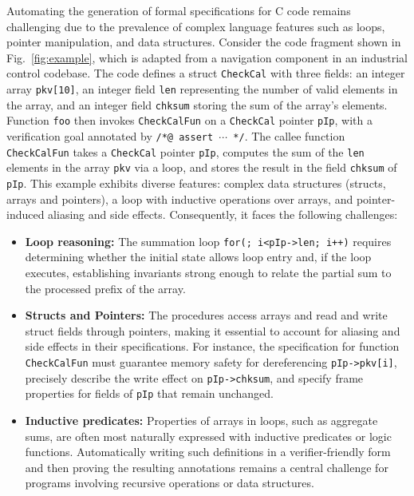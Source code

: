 
\newcommand{\annotate}[1]{{\color{figloop!75!black} \mathsf{#1}}}

Automating the generation of formal specifications for C code remains challenging due to the prevalence of complex language features such as loops, pointer manipulation, and data structures. Consider the code fragment shown in Fig.~\ref{fig:example}, which is adapted from a navigation component in an industrial control codebase. The code defines a struct \texttt{CheckCal} with three fields: an integer array \texttt{pkv[10]}, an integer field \texttt{len} representing the number of valid elements in the array, and an integer field \texttt{chksum} storing the sum of the array's elements. Function \texttt{foo} then invokes \texttt{CheckCalFun} on a \texttt{CheckCal} pointer \texttt{pIp}, with a verification goal annotated by \texttt{/*@ assert $\cdots$ */}. The callee function \texttt{CheckCalFun} takes a \texttt{CheckCal} pointer \texttt{pIp}, computes the sum of the \texttt{len} elements in the array \texttt{pkv} via a loop, and stores the result in the field \texttt{chksum} of \texttt{pIp}.
This example exhibits diverse features: complex data structures (structs, arrays and pointers), a loop with inductive operations over arrays, and pointer-induced aliasing and side effects.
Consequently, it faces the following challenges:
\begin{itemize}
  \item \textbf{Loop reasoning:}  
  The summation loop \texttt{for(; i<pIp->len; i++)} requires determining whether the initial state allows loop entry and, if the loop executes, establishing invariants strong enough to relate the partial sum to the processed prefix of the array.
  
  \item \textbf{Structs and Pointers:} The procedures access arrays and read and write struct fields through pointers, making it essential to account for aliasing and side effects in their specifications. For instance, the specification for function \texttt{CheckCalFun} must guarantee memory safety for dereferencing \texttt{pIp->pkv[i]}, precisely describe the write effect on \texttt{pIp->chksum}, and specify frame properties for fields of \texttt{pIp} that remain unchanged. 
  
  \item \textbf{Inductive predicates:}  
  Properties of arrays in loops, such as aggregate sums, are often most naturally expressed with inductive predicates or logic functions. Automatically writing such definitions in a verifier-friendly form and then proving the resulting annotations remains a central challenge for programs involving recursive operations or data structures.
\end{itemize}

